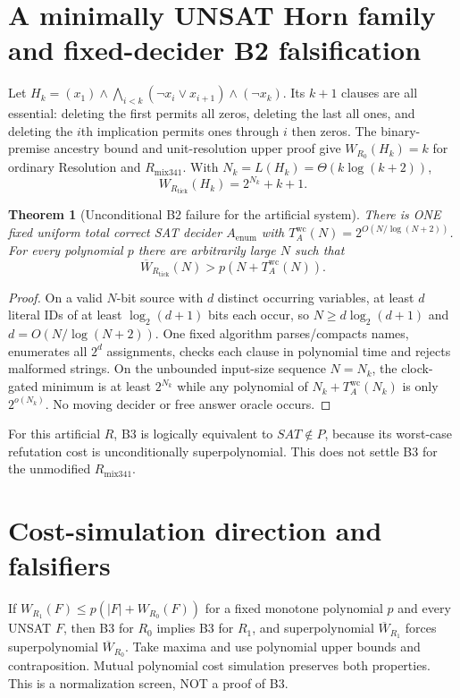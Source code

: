 \documentclass[11pt]{article}
\newtheorem{theorem}{Theorem}
\begin{document}
\section{A minimally UNSAT Horn family and fixed-decider B2 falsification}
Let $H_k=(x_1)\land\bigwedge_{i<k}(\neg x_i\lor x_{i+1})\land(\neg x_k)$. Its $k+1$ clauses are all essential: deleting the first permits all zeros, deleting the last all ones, and deleting the $i$th implication permits ones through $i$ then zeros. The binary-premise ancestry bound and unit-resolution upper proof give $W_{R_0}(H_k)=k$ for ordinary Resolution and $R_{\mathrm{mix341}}$. With $N_k=L(H_k)=\Theta(k\log(k+2))$,
\[
\boxed{W_{R_{\mathrm{tick}}}(H_k)=2^{N_k}+k+1.}
\]

\begin{theorem}[Unconditional B2 failure for the artificial system]
There is ONE fixed uniform total correct SAT decider $A_{\mathrm{enum}}$ with $T_A^{\mathrm{wc}}(N)=2^{O(N/\log(N+2))}$. For every polynomial $p$ there are arbitrarily large $N$ such that
\[
\overline W_{R_{\mathrm{tick}}}(N)>p(N+T_A^{\mathrm{wc}}(N)).
\]
\end{theorem}
\begin{proof}
On a valid $N$-bit source with $d$ distinct occurring variables, at least $d$ literal IDs of at least $\log_2(d+1)$ bits each occur, so $N\ge d\log_2(d+1)$ and $d=O(N/\log(N+2))$. One fixed algorithm parses/compacts names, enumerates all $2^d$ assignments, checks each clause in polynomial time and rejects malformed strings. On the unbounded input-size sequence $N=N_k$, the clock-gated minimum is at least $2^{N_k}$ while any polynomial of $N_k+T_A^{\mathrm{wc}}(N_k)$ is only $2^{o(N_k)}$. No moving decider or free answer oracle occurs.
\end{proof}
\noindent For this artificial $R$, B3 is logically equivalent to $SAT\notin P$, because its worst-case refutation cost is unconditionally superpolynomial. This does not settle B3 for the unmodified $R_{\mathrm{mix341}}$.

\section{Cost-simulation direction and falsifiers}
If $W_{R_1}(F)\le p(|F|+W_{R_0}(F))$ for a fixed monotone polynomial $p$ and every UNSAT $F$, then B3 for $R_0$ implies B3 for $R_1$, and superpolynomial $\overline W_{R_1}$ forces superpolynomial $\overline W_{R_0}$. Take maxima and use polynomial upper bounds and contraposition. Mutual polynomial cost simulation preserves both properties. This is a normalization screen, NOT a proof of B3.
\end{document}
